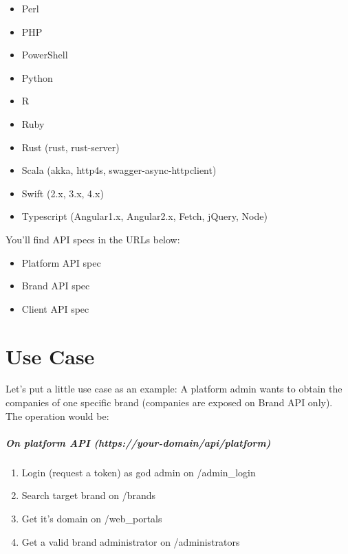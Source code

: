 \documentclass[letterpaper,10pt,english]{sphinxmanual}
\begin{document}
\begin{itemize}
\item {} 
Perl

\item {} 
PHP

\item {} 
PowerShell

\item {} 
Python

\item {} 
R

\item {} 
Ruby

\item {} 
Rust (rust, rust-server)

\item {} 
Scala (akka, http4s, swagger-async-httpclient)

\item {} 
Swift (2.x, 3.x, 4.x)

\item {} 
Typescript (Angular1.x, Angular2.x, Fetch, jQuery, Node)

\end{itemize}

You'll find API specs in the URLs below:
\begin{itemize}
\item {} 
Platform API spec

\item {} 
Brand API spec

\item {} 
Client API spec

\end{itemize}


\chapter{Use Case}
\label{api_rest/use_case:use-case}\label{api_rest/use_case::doc}
Let's put a little use case as an example: A platform admin wants to obtain the companies of one specific brand (companies are exposed on Brand API only). The operation would be:
\paragraph{On platform API (https://your-domain/api/platform)}
\begin{enumerate}
\item {} 
Login (request a token) as god admin on /admin\_login

\item {} 
Search target brand on /brands

\item {} 
Get it's domain on /web\_portals

\item {} 
Get a valid brand administrator on /administrators

\end{enumerate}
\end{document}
